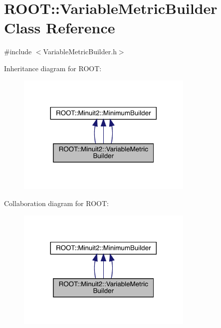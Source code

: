 \hypertarget{classROOT_1_1Minuit2_1_1VariableMetricBuilder}{}\section{R\+O\+OT\+:\+:Variable\+Metric\+Builder Class Reference}
\label{classROOT_1_1Minuit2_1_1VariableMetricBuilder}


{\ttfamily \#include $<$Variable\+Metric\+Builder.\+h$>$}



Inheritance diagram for R\+O\+OT\+:
\nopagebreak
\begin{figure}[H]
\begin{center}
\leavevmode
\includegraphics[width=239pt]{dc/dfd/classROOT_1_1Minuit2_1_1VariableMetricBuilder__inherit__graph}
\end{center}
\end{figure}


Collaboration diagram for R\+O\+OT\+:
\nopagebreak
\begin{figure}[H]
\begin{center}
\leavevmode
\includegraphics[width=239pt]{dd/de2/classROOT_1_1Minuit2_1_1VariableMetricBuilder__coll__graph}
\end{center}
\end{figure}
